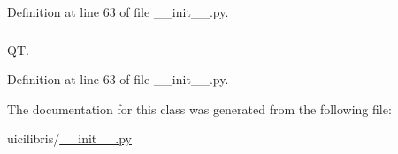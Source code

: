 \-Definition at line 63 of file \-\_\-\-\_\-init\-\_\-\-\_\-.\-py.

\hypertarget{classuicilibris_1_1w2mMainWindow_a7ba2f6374f9d3d52acf7f99f8eac18d1}{
\subsubsection[{window\-Title}]{}}\label{classuicilibris_1_1w2mMainWindow_a7ba2f6374f9d3d52acf7f99f8eac18d1}


\-Q\-T. 



\-Definition at line 63 of file \-\_\-\-\_\-init\-\_\-\-\_\-.\-py.



\-The documentation for this class was generated from the following file\-:\begin{DoxyCompactItemize}
\item 
uicilibris/\hyperlink{____init_____8py}{\-\_\-\-\_\-init\-\_\-\-\_\-.\-py}\end{DoxyCompactItemize}
